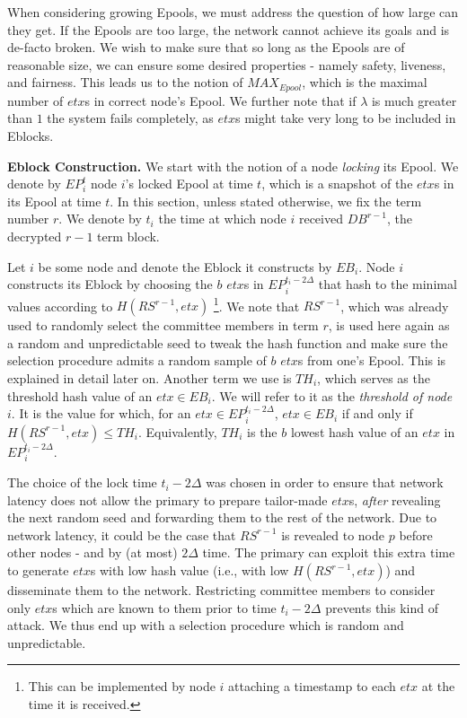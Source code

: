When considering growing Epools, we must address the question of how large can they get. If the Epools are too large, the network cannot achieve its goals and is de-facto broken. We wish to make sure that so long as the Epools are of reasonable size, we can ensure some desired properties - namely safety, liveness, and fairness. This leads us to the notion of $MAX_{Epool}$, which is the maximal number of $etx$s in correct node's Epool. We further note that if $\lambda$ is much greater than $1$ the system fails completely, as $etx$s might take very long to be included in Eblocks.

\textbf{Eblock Construction.} We start with the notion of a node \emph{locking} its Epool. We denote by $EP_i^t$ node $i$'s locked Epool at time $t$, which is a snapshot of the $etx$s in its Epool at time $t$. In this section, unless stated otherwise, we fix the term number $r$. We denote by $t_i$ the time at which node $i$ received $DB^{r-1}$, the decrypted $r-1$ term block. 

Let $i$ be some node and denote the Eblock it constructs by $EB_i$. Node $i$ constructs its Eblock by choosing the $b$ $etx$s in $EP_i^{t_i-2\Delta}$ that hash to the minimal values according to $H(RS^{r-1},etx)$ \footnote{This can be implemented by node $i$ attaching a timestamp to each $etx$ at the time it is received.}. We note that $RS^{r-1}$, which was already used to randomly select the committee members in term $r$, is used here again as a random and unpredictable seed to tweak the hash function and make sure the selection procedure admits a random sample of $b$ $etx$s from one's Epool. This is explained in detail later on. Another term we use is $TH_i$, which serves as the threshold hash value of an $etx\in EB_i$. We will refer to it as the \textit{threshold of node $i$}. It is the value for which, for an $etx\in EP_i^{t_i-2\Delta}$, $etx\in EB_i$ if and only if $H(RS^{r-1},etx)\leq TH_i$. Equivalently, $TH_i$ is the $b$ lowest hash value of an $etx$ in $EP_i^{t_i-2\Delta}$. 

The choice of the lock time $t_i-2\Delta$ was chosen in order to ensure that network latency does not allow the primary to prepare tailor-made $etx$s, \emph{after} revealing the next random seed and forwarding them to the rest of the network. 
Due to network latency, it could be the case that $RS^{r-1}$ is revealed to node $p$ before other nodes - and by (at most) $2\Delta$ time. The primary can exploit this extra time to generate $etx$s with low hash value (i.e., with low $H(RS^{r-1},etx)$) and disseminate them to the network. Restricting committee members to consider only $etx$s which are known to them prior to time $t_i-2\Delta$ prevents this kind of attack. We thus end up with a selection procedure which is random and unpredictable.


